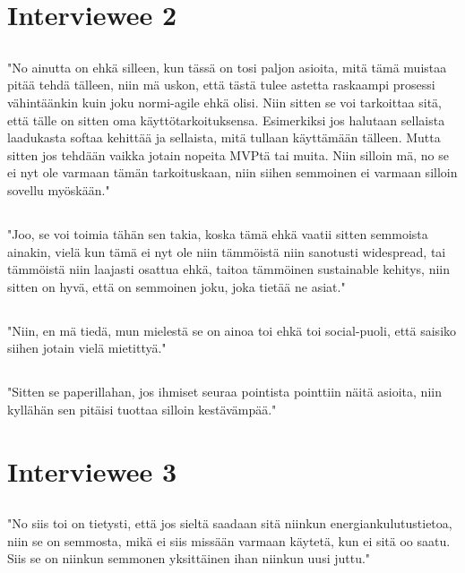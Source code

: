 \section{Interviewee 2}
\subsection{}\label{i21}
"No ainutta on ehkä silleen, kun tässä on tosi paljon asioita, mitä tämä muistaa pitää tehdä tälleen, niin mä uskon, että tästä tulee astetta raskaampi prosessi vähintäänkin kuin joku normi-agile ehkä olisi.
Niin sitten se voi tarkoittaa sitä, että tälle on sitten oma käyttötarkoituksensa.
Esimerkiksi jos halutaan sellaista laadukasta softaa kehittää ja sellaista, mitä tullaan käyttämään tälleen.
Mutta sitten jos tehdään vaikka jotain nopeita MVPtä tai muita.
Niin silloin mä, no se ei nyt ole varmaan tämän tarkoituskaan, niin siihen semmoinen ei varmaan silloin sovellu myöskään."
\subsection{}\label{i22}
"Joo, se voi toimia tähän sen takia, koska tämä ehkä vaatii sitten semmoista ainakin, vielä kun tämä ei nyt ole niin tämmöistä niin sanotusti widespread, tai tämmöistä niin laajasti osattua ehkä, taitoa tämmöinen sustainable kehitys, niin sitten on hyvä, että on semmoinen joku, joka tietää ne asiat."
\subsection{}\label{i23}
"Niin, en mä tiedä, mun mielestä se on ainoa toi ehkä toi social-puoli, että saisiko siihen jotain vielä mietittyä."
\subsection{}\label{i24}
"Sitten se paperillahan, jos ihmiset seuraa pointista pointtiin näitä asioita, niin kyllähän sen pitäisi tuottaa silloin kestävämpää."

\section{Interviewee 3}
\subsection{}\label{i31}
"No siis toi on tietysti, että jos sieltä saadaan sitä niinkun energiankulutustietoa, niin se on semmosta, mikä ei siis missään varmaan käytetä, kun ei sitä oo saatu.
Siis se on niinkun semmonen yksittäinen ihan niinkun uusi juttu."
